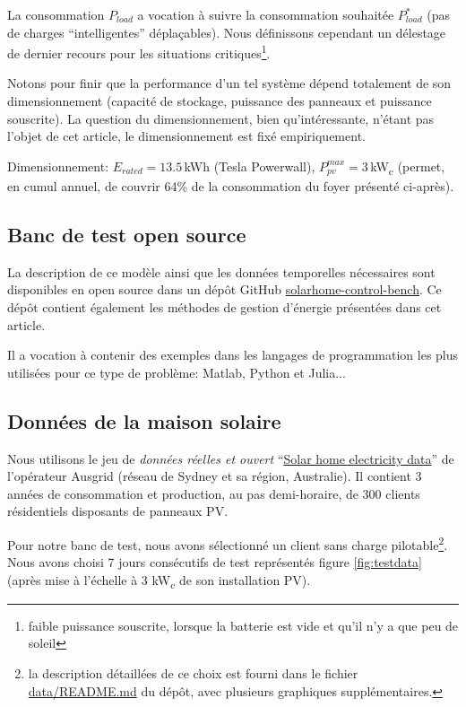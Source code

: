 \documentclass[a4paper,10pt,twocolumn]{article}
\begin{document}
La consommation $P_{load}$ a vocation à suivre la consommation souhaitée $P_{load}^*$
(pas de charges ``intelligentes'' déplaçables). Nous définissons cependant un délestage de dernier
recours pour les situations critiques\footnote{faible puissance souscrite, lorsque
la batterie est vide et qu'il n'y a que peu de soleil}.

Notons pour finir que la performance d'un tel système dépend totalement de son dimensionnement
(capacité de stockage, puissance des panneaux et  puissance souscrite).
La question du dimensionnement, bien qu'intéressante, n'étant pas l'objet de cet article,
le dimensionnement est fixé empiriquement.

Dimensionnement: $E_{rated}=13.5\,$kWh (Tesla Powerwall), $P_{pv}^{max}=3\,$kW\textsubscript{c} (permet, en cumul annuel, de couvrir 64\% de la consommation du foyer présenté ci-après).

\subsection{Banc de test open source}

La description de ce modèle ainsi que les données temporelles nécessaires sont
disponibles en open source dans un dépôt GitHub \href{https://github.com/pierre-haessig/solarhome-control-bench}{solarhome-control-bench}.
Ce dépôt contient également les méthodes de gestion d'énergie présentées dans cet article.

Il a vocation à contenir des exemples dans les langages de programmation les plus utilisées pour ce type de problème:
Matlab, Python et Julia...

\subsection{Données de la maison solaire}

Nous utilisons le jeu de \emph{données réelles et ouvert} ``\href{https://www.ausgrid.com.au/Common/About-us/Corporate-information/Data-to-share/Solar-home-electricity-data.aspx}{Solar home electricity data}'' de l'opérateur Ausgrid (réseau de Sydney et sa région, Australie).
Il contient 3 années de consommation et production, au pas demi-horaire, de 300 clients résidentiels disposants de panneaux PV.

Pour notre banc de test, nous avons sélectionné un client sans charge pilotable\footnote{
  la description détaillées de ce choix est fourni dans le fichier \href{https://github.com/pierre-haessig/solarhome-control-bench/blob/master/data/README.md}{data/README.md} du dépôt, avec plusieurs graphiques supplémentaires.}.
Nous avons choisi 7 jours consécutifs de test représentés figure \ref{fig:testdata} (après mise à l'échelle à 3 kW\textsubscript{c} de son installation PV).
\end{document}
